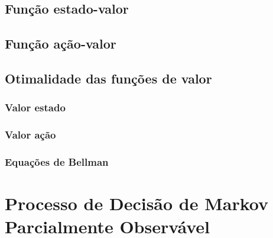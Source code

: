 \documentclass{article}
\begin{document}
        \subsection{Função estado-valor}
        
        \subsection{Função ação-valor}
        
        \subsection{Otimalidade das funções de valor}
        
            \subsubsection{Valor estado}
            
            \subsubsection{Valor ação}
            
            \subsubsection{Equações de Bellman}
        
    \section{Processo de Decisão de Markov Parcialmente Observável}
\end{document}
